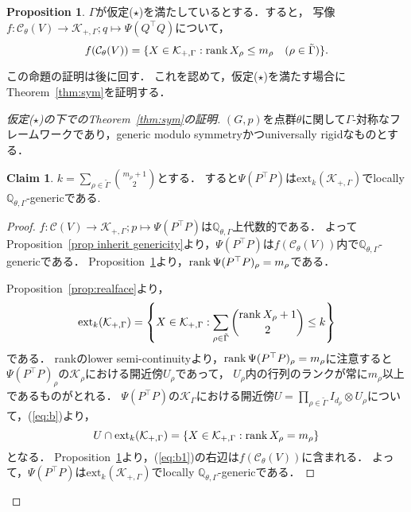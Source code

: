 \documentclass[11pt]{article}
\theoremstyle{definition}
\newtheorem{prop}[defi]{Proposition}
\newtheorem{claim}[defi]{Claim}
\begin{document}
    \begin{prop} \label{prop:range}
        $\Gamma$が仮定($\star$)を満たしているとする．すると，
        写像$f:\mathcal{C}_\theta(V) \rightarrow \mathcal{K}_{+,\Gamma}; q \mapsto \Psi(Q^\top Q)$について，
        \[
            f(\mathcal{C}_\theta(V)) = \{ X \in \mathcal{K}_{+,\Gamma} : \rank X_\rho \leq m_\rho \quad (\rho \in \tilde{\Gamma}) \}.
        \]
    \end{prop}
    この命題の証明は後に回す．
    これを認めて，仮定($\star$)を満たす場合にTheorem~\ref{thm:sym}を証明する．
    \begin{proof}[仮定($\star$)の下でのTheorem~\ref{thm:sym}の証明]
    $(G,p)$を点群$\theta$に関して$\Gamma$-対称なフレームワークであり，generic modulo symmetryかつuniversally rigidなものとする．
    \begin{claim} \label{claim:1}
        $k=\sum_{\rho \in \tilde{\Gamma}} \binom{m_\rho+1}{2}$とする．
        すると$\Psi(P^\top P)$は$\text{ext}_k(\mathcal{K}_{+,\Gamma})$でlocally $\mathbb{Q}_{\theta,\Gamma}$-genericである.
    \end{claim}
    \begin{proof}
        $f:\mathcal{C}(V) \rightarrow \mathcal{K}_{+,\Gamma}; p \mapsto \Psi(P^\top P)$は$\mathbb{Q}_{\theta,\Gamma}$上代数的である．
        よってProposition~\ref{prop inherit genericity}より，$\Psi(P^\top P)$は$f(\mathcal{C}_\theta(V))$内で$\mathbb{Q}_{\theta,\Gamma}$-genericである．
        Proposition~\ref{prop:range}より，$\rank \Psi(P^\top P)_\rho = m_\rho$である．

        Proposition~\ref{prop:realface}より，
        \begin{equation} \label{eq:b}
            \text{ext}_k(\mathcal{K}_{+,\Gamma}) = \left\{ X \in \mathcal{K}_{+,\Gamma} : \sum_{\rho \in \tilde{\Gamma}} \binom{\rank X_\rho +1}{2} \leq k \right\}
        \end{equation}
        である．
        rankのlower semi-continuityより，$\rank \Psi(P^\top P)_\rho = m_\rho$に注意すると$\Psi(P^\top P)_\rho$の$\mathcal{K}_\rho$における開近傍$U_\rho$であって，
        $U_\rho$内の行列のランクが常に$m_\rho$以上であるものがとれる．
        $\Psi(P^\top P)$の$\mathcal{K}_\Gamma$における開近傍$U=\prod_{\rho \in \tilde{\Gamma}} I_{d_\rho} \otimes U_\rho$について，(\ref{eq:b})より，
        \begin{equation} \label{eq:b1}
            U \cap \text{ext}_k(\mathcal{K}_{+,\Gamma})
            = \left\{ X \in \mathcal{K}_{+,\Gamma} : \rank X_\rho = m_\rho \right\}
        \end{equation}
        となる．
        Proposition~\ref{prop:range}より，(\ref{eq:b1})の右辺は$f(\mathcal{C}_\theta(V))$に含まれる．
        よって，$\Psi(P^\top P)$は$\text{ext}_k(\mathcal{K}_{+,\Gamma})$でlocally $\mathbb{Q}_{\theta,\Gamma}$-genericである．
    \end{proof}
    

\end{proof}
\end{document}
